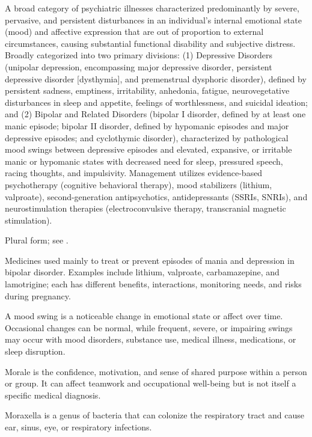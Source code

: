  A broad category of psychiatric illnesses characterized predominantly by severe, pervasive, and persistent disturbances in an individual's internal emotional state (mood) and affective expression that are out of proportion to external circumstances, causing substantial functional disability and subjective distress. Broadly categorized into two primary divisions: (1) Depressive Disorders (unipolar depression, encompassing major depressive disorder, persistent depressive disorder [dysthymia], and premenstrual dysphoric disorder), defined by persistent sadness, emptiness, irritability, anhedonia, fatigue, neurovegetative disturbances in sleep and appetite, feelings of worthlessness, and suicidal ideation; and (2) Bipolar and Related Disorders (bipolar I disorder, defined by at least one manic episode; bipolar II disorder, defined by hypomanic episodes and major depressive episodes; and cyclothymic disorder), characterized by pathological mood swings between depressive episodes and elevated, expansive, or irritable manic or hypomanic states with decreased need for sleep, pressured speech, racing thoughts, and impulsivity. Management utilizes evidence-based psychotherapy (cognitive behavioral therapy), mood stabilizers (lithium, valproate), second-generation antipsychotics, antidepressants (SSRIs, SNRIs), and neurostimulation therapies (electroconvulsive therapy, transcranial magnetic stimulation).

 Plural form; see .

 Medicines used mainly to treat or prevent episodes of mania and depression in bipolar disorder. Examples include lithium, valproate, carbamazepine, and lamotrigine; each has different benefits, interactions, monitoring needs, and risks during pregnancy.

 A mood swing is a noticeable change in emotional state or affect over time. Occasional changes can be normal, while frequent, severe, or impairing swings may occur with mood disorders, substance use, medical illness, medications, or sleep disruption.

 Morale is the confidence, motivation, and sense of shared purpose within a person or group. It can affect teamwork and occupational well-being but is not itself a specific medical diagnosis.

 Moraxella is a genus of bacteria that can colonize the respiratory tract and cause ear, sinus, eye, or respiratory infections.

